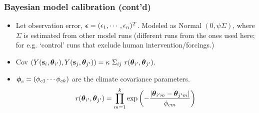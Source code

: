 \documentclass{beamer}
\begin{document}
\begin{frame}
 \frametitle{Bayesian model calibration (cont'd)}
    \begin{itemize}
    \item Let observation error,
      $\mbox{\boldmath $\epsilon$}=(\epsilon_1,\cdots,\epsilon_n)^T$. Modeled as Normal
      $(0,\psi \Sigma)$, where $\Sigma$ is estimated from other model runs (different runs from the ones used here; for e.g. `control' runs that exclude human intervention/forcings.)
\item Cov $(Y({\bf s}_i,\mbox{\boldmath $\theta$}_{i'}),Y({\bf s}_j,\mbox{\boldmath $\theta$}_{j'}))=\kappa ~\Sigma_{ij} ~ r(\mbox{\boldmath $\theta$}_{i'},\mbox{\boldmath $\theta$}_{j'}).$
    	\item $\mbox{\boldmath $\phi$}_c=(\phi_{c1}\cdots \phi_{ck})$ are the climate covariance parameters.
	\begin{equation*} \label{eq:covfun2}
r(\mbox{\boldmath $\theta$}_{i'},\mbox{\boldmath $\theta$}_{j'})=\prod^k _{m=1}{\exp \left(-\frac{|\mbox{\boldmath $\theta$}_{i'm}-\mbox{\boldmath $\theta$}_{j'm}|}{\phi_{cm}} \right)}
\end{equation*}

  \begin{figure}
\begin{center} 
\end{center}
 \end{figure}
      \end{itemize}
\end{frame}
\end{document}
